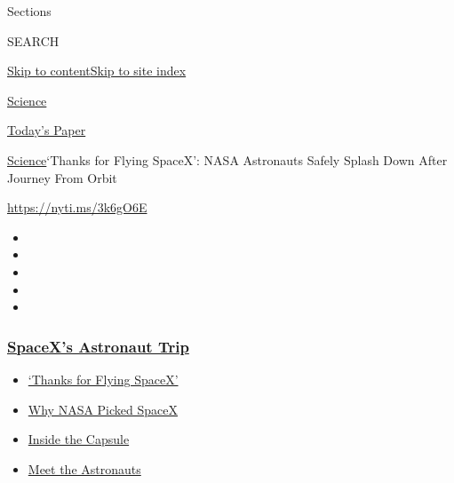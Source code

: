 Sections

SEARCH

\protect\hyperlink{site-content}{Skip to
content}\protect\hyperlink{site-index}{Skip to site index}

\href{https://www.nytimes3xbfgragh.onion/section/science}{Science}

\href{https://myaccount.nytimes3xbfgragh.onion/auth/login?response_type=cookie\&client_id=vi}{}

\href{https://www.nytimes3xbfgragh.onion/section/todayspaper}{Today's
Paper}

\href{/section/science}{Science}\textbar{}`Thanks for Flying SpaceX':
NASA Astronauts Safely Splash Down After Journey From Orbit

\url{https://nyti.ms/3k6gO6E}

\begin{itemize}
\item
\item
\item
\item
\item
\end{itemize}

\hypertarget{spacexs-astronaut-trip}{%
\subsubsection{\texorpdfstring{\href{https://www.nytimes3xbfgragh.onion/2020/08/02/science/spacex-astronauts-splashdown.html?name=styln-nasa-spacex\&region=TOP_BANNER\&block=storyline_menu_recirc\&action=click\&pgtype=Article\&impression_id=0ae11df0-f2d6-11ea-a5b3-8155027c1ab2\&variant=undefined}{SpaceX's
Astronaut
Trip}}{SpaceX's Astronaut Trip}}\label{spacexs-astronaut-trip}}

\begin{itemize}
\tightlist
\item
  \href{https://www.nytimes3xbfgragh.onion/2020/08/02/science/spacex-astronauts-splashdown.html?name=styln-nasa-spacex\&region=TOP_BANNER\&block=storyline_menu_recirc\&action=click\&pgtype=Article\&impression_id=0ae11df0-f2d6-11ea-a5b3-8155027c1ab2\&variant=undefined}{`Thanks
  for Flying SpaceX'}
\item
  \href{https://www.nytimes3xbfgragh.onion/2020/05/26/science/spacex-launch-nasa.html?name=styln-nasa-spacex\&region=TOP_BANNER\&block=storyline_menu_recirc\&action=click\&pgtype=Article\&impression_id=0ae11df1-f2d6-11ea-a5b3-8155027c1ab2\&variant=undefined}{Why
  NASA Picked SpaceX}
\item
  \href{https://www.nytimes3xbfgragh.onion/interactive/2020/05/26/science/spacex-nasa.html?name=styln-nasa-spacex\&region=TOP_BANNER\&block=storyline_menu_recirc\&action=click\&pgtype=Article\&impression_id=0ae14500-f2d6-11ea-a5b3-8155027c1ab2\&variant=undefined}{Inside
  the Capsule}
\item
  \href{https://www.nytimes3xbfgragh.onion/2020/05/27/science/bob-behnken-doug-hurley.html?name=styln-nasa-spacex\&region=TOP_BANNER\&block=storyline_menu_recirc\&action=click\&pgtype=Article\&impression_id=0ae14501-f2d6-11ea-a5b3-8155027c1ab2\&variant=undefined}{Meet
  the Astronauts}
\end{itemize}

